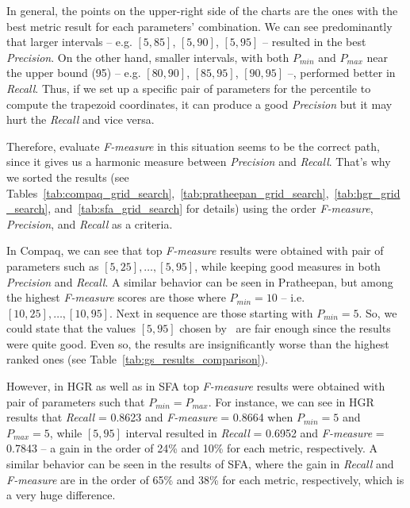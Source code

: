 In general, the points on the upper-right side of the charts are the ones with the best metric result for each parameters' combination. We can see predominantly that larger intervals -- e.g. $[5, 85]$, $[5, 90]$, $[5, 95]$ -- resulted in the best \emph{Precision}. On the other hand, smaller intervals, with both $P_{min}$ and $P_{max}$ near the upper bound (95) -- e.g. $[80, 90]$, $[85, 95]$, $[90 ,95]$ --, performed better in \emph{Recall}. Thus, if we set up a specific pair of parameters for the percentile to compute the trapezoid coordinates, it can produce a good \emph{Precision} but it may hurt the \emph{Recall} and vice versa.

Therefore, evaluate \emph{F-measure} in this situation seems to be the correct path, since it gives us a harmonic measure between \emph{Precision} and \emph{Recall}. That's why we sorted the results (see Tables~\ref{tab:compaq_grid_search},~\ref{tab:pratheepan_grid_search},~\ref{tab:hgr_grid_search}, and~\ref{tab:sfa_grid_search} for details) using the order \emph{F-measure}, \emph{Precision}, and \emph{Recall} as a criteria.

In Compaq, we can see that top \emph{F-measure} results were obtained with pair of parameters such as $[5, 25], \ldots, [5, 95]$, while keeping good measures in both \emph{Precision} and \emph{Recall}. A similar behavior can be seen in Pratheepan, but among the highest \emph{F-measure} scores are those where $P_{min} = 10$ -- i.e. $[10, 25], \ldots, [10, 95]$. Next in sequence are those starting with $P_{min} = 5$. So, we could state that the values $[5, 95]$ chosen by~\citet{brancati:17} are fair enough since the results were quite good. Even so, the results are insignificantly worse than the highest ranked ones (see Table~\ref{tab:gs_results_comparison}).

However, in HGR as well as in SFA top \emph{F-measure} results were obtained with pair of parameters such that $P_{min} = P_{max}$. For instance, we can see in HGR results that \emph{Recall} = 0.8623 and \emph{F-measure} = 0.8664 when $P_{min} = 5$ and $P_{max} = 5$, while $[5, 95]$ interval resulted in \emph{Recall} = 0.6952 and \emph{F-measure} = 0.7843 -- a gain in the order of 24\% and 10\% for each metric, respectively. A similar behavior can be seen in the results of SFA, where the gain in \emph{Recall} and \emph{F-measure} are in the order of 65\% and 38\% for each metric, respectively, which is a very huge difference.




